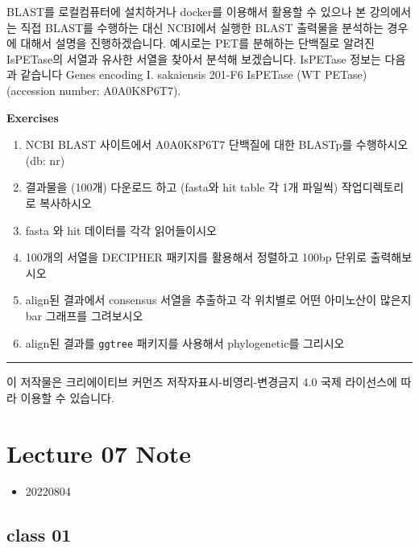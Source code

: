 \documentclass[
]{book}
\providecommand{\tightlist}{%
  \setlength{\itemsep}{0pt}\setlength{\parskip}{0pt}}
\begin{document}
BLAST를 로컬컴퓨터에 설치하거나 docker를 이용해서 활용할 수 있으나 본 강의에서는 직접 BLAST를 수행하는 대신 NCBI에서 실행한 BLAST 출력물을 분석하는 경우에 대해서 설명을 진행하겠습니다. 예시로는 PET를 분해하는 단백질로 알려진 IsPETase의 서열과 유사한 서열을 찾아서 분석해 보겠습니다. IsPETase 정보는 다음과 같습니다 Genes encoding I. sakaiensis 201-F6 IsPETase (WT PETase) (accession number: A0A0K8P6T7).

\textbf{Exercises }

\begin{enumerate}
\def\labelenumi{\arabic{enumi})}
\item
  NCBI BLAST 사이트에서 A0A0K8P6T7 단백질에 대한 BLASTp를 수행하시오 (db: nr)
\item
  결과물을 (100개) 다운로드 하고 (fasta와 hit table 각 1개 파일씩) 작업디렉토리로 복사하시오
\item
  fasta 와 hit 데이터를 각각 읽어들이시오
\item
  100개의 서열을 DECIPHER 패키지를 활용해서 정렬하고 100bp 단위로 출력해보시오
\item
  align된 결과에서 consensus 서열을 추출하고 각 위치별로 어떤 아미노산이 많은지 bar 그래프를 그려보시오
\item
  align된 결과를 \texttt{ggtree} 패키지를 사용해서 phylogenetic를 그리시오
\end{enumerate}

\begin{center}\rule{0.5\linewidth}{0.5pt}\end{center}

이 저작물은 크리에이티브 커먼즈 저작자표시-비영리-변경금지 4.0 국제 라이선스에 따라 이용할 수 있습니다.

\hypertarget{lecture-07-note}{%
\chapter{Lecture 07 Note}\label{lecture-07-note}}

\begin{itemize}
\tightlist
\item
  20220804
\end{itemize}

\hypertarget{class-01-2}{%
\section{class 01}\label{class-01-2}}
\end{document}
